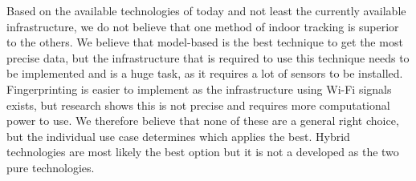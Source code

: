 Based on the available technologies of today and not least the currently available infrastructure, we do not believe that one method of indoor tracking is superior to the others.
We believe that model-based is the best technique to get the most precise data, but the infrastructure that is required to use this technique needs to be implemented and is a huge task, as it requires a lot of sensors to be installed. 
Fingerprinting is easier to implement as the infrastructure using Wi-Fi signals exists, but research shows this is not precise and requires more computational power to use. 
We therefore believe that none of these are a general right choice, but the individual use case determines which applies the best.
Hybrid technologies are most likely the best option but it is not a developed as the two pure technologies. 
